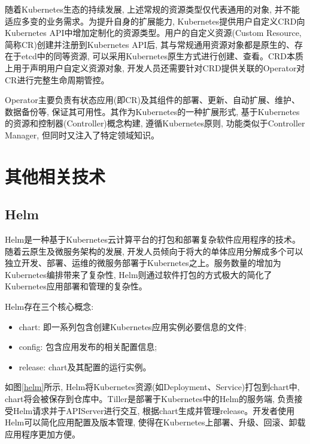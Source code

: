 随着Kubernetes生态的持续发展, 上述常规的资源类型仅代表通用的对象, 并不能适应多变的业务需求。为提升自身的扩展能力, Kubernetes提供用户自定义CRD向Kubernetes API中增加定制化的资源类型。用户的自定义资源(Custom Resource, 简称CR)创建并注册到Kubernetes API后, 其与常规通用资源对象都是原生的、存在于etcd中的同等资源, 可以采用Kubernetes原生方式进行创建、查看。CRD本质上用于声明用户自定义资源对象, 开发人员还需要针对CRD提供关联的Operator对CR进行完整生命周期管控。

Operator主要负责有状态应用(即CR)及其组件的部署、更新、自动扩展、维护、数据备份等, 保证其可用性。其作为Kubernetes的一种扩展形式, 基于Kubernetes的资源和控制器(Controller)概念构建, 遵循Kubernetes原则, 功能类似于Controller Manager, 但同时又注入了特定领域知识。

\section{其他相关技术}\label{section: other_technologies}

\subsection{Helm}

Helm是一种基于Kubernetes云计算平台的打包和部署复杂软件应用程序的技术\cite{spillner2019quality}。随着云原生及微服务架构的发展, 开发人员倾向于将大的单体应用分解成多个可以独立开发、部署、运维的微服务部署于Kubernetes之上。服务数量的增加为Kubernetes编排带来了复杂性, Helm则通过软件打包的方式极大的简化了Kubernetes应用部署和管理的复杂性。

Helm存在三个核心概念:

\begin{itemize}[itemindent=2em]
    \item chart: 即一系列包含创建Kubernetes应用实例必要信息的文件;

    \item config: 包含应用发布的相关配置信息;

    \item release: chart及其配置的运行实例。
\end{itemize}

如图\ref{helm}所示, Helm将Kubernetes资源(如Deployment、Service)打包到chart中, chart将会被保存到仓库中。Tiller是部署于Kubernetes中的Helm的服务端, 负责接受Helm请求并于APIServer进行交互, 根据chart生成并管理release。开发者使用Helm可以简化应用配置及版本管理, 使得在Kubernetes上部署、升级、回滚、卸载应用程序更加方便。

